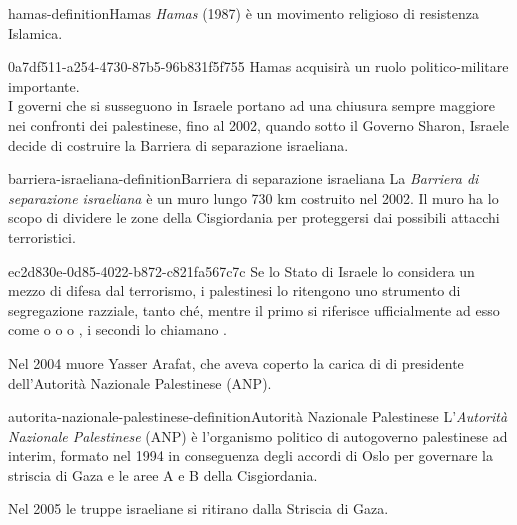 \documentclass[preview]{standalone}
\begin{document}
\begin{snippetdefinition}{hamas-definition}{Hamas}
    \textit{Hamas} (1987) è un movimento religioso di resistenza Islamica.
\end{snippetdefinition}

\begin{snippet}{0a7df511-a254-4730-87b5-96b831f5f755}
    Hamas acquisirà un ruolo politico-militare importante.
    \\
    I governi che si susseguono in Israele portano ad una chiusura sempre maggiore
    nei confronti dei palestinese, fino al 2002, quando sotto il Governo
    Sharon, Israele decide di costruire la Barriera di separazione israeliana.
\end{snippet}

\begin{snippetdefinition}{barriera-israeliana-definition}{Barriera di separazione israeliana}
    La \textit{Barriera di separazione israeliana} è un muro lungo 730 km costruito nel 2002.
    Il muro ha lo scopo di dividere le zone della Cisgiordania per proteggersi
    dai possibili attacchi terroristici.
\end{snippetdefinition}

\begin{snippet}{ec2d830e-0d85-4022-b872-c821fa567c7c}
    Se lo Stato di Israele lo considera un mezzo di difesa dal terrorismo,
    i palestinesi lo ritengono uno strumento di segregazione razziale,
    tanto ché, mentre il primo si riferisce ufficialmente ad esso come
     o  o
     o ,
    i secondi lo chiamano .
    
    Nel 2004 muore Yasser Arafat, che aveva coperto la carica di
    di presidente dell'Autorità Nazionale Palestinese (ANP).
\end{snippet}

\begin{snippetdefinition}{autorita-nazionale-palestinese-definition}{Autorità Nazionale Palestinese}
    L'\textit{Autorità Nazionale Palestinese} (ANP) è
    l'organismo politico di autogoverno palestinese ad interim,
    formato nel 1994 in conseguenza degli accordi di Oslo
    per governare la striscia di Gaza e le aree A e B della Cisgiordania. 
\end{snippetdefinition}

\begin{plainhtml}
    Nel 2005 le truppe israeliane si ritirano dalla Striscia di Gaza.
\end{plainhtml}
\end{document}
